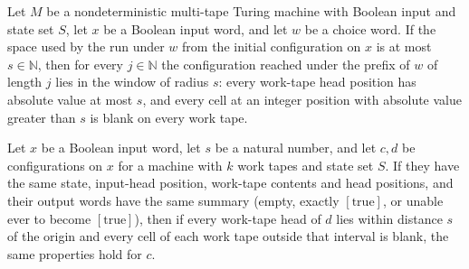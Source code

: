 \begin{theorem}
\label{Turing.NDTM.runWith_take_inWindow}
\leanok
{}
Let $M$ be a nondeterministic multi-tape Turing machine with Boolean input and state set
$S$, let $x$ be a Boolean input word, and let $w$ be a choice word. If the space used by
the run under $w$ from the initial configuration on $x$ is at most $s\in\mathbb{N}$,
then for every $j\in\mathbb{N}$ the configuration reached under the prefix of $w$ of
length $j$ lies in the window of radius $s$: every work-tape head position has absolute
value at most $s$, and every cell at an integer position with absolute value greater
than $s$ is blank on every work tape.
\end{theorem}

\begin{theorem}
\label{Turing.NDTM.inWindow_of_coreSum_eq}
\leanok
{}
Let $x$ be a Boolean input word, let $s$ be a natural number, and let $c,d$ be
configurations on $x$ for a machine with $k$ work tapes and state set $S$. If they have
the same state, input-head position, work-tape contents and head positions, and their
output words have the same summary (empty, exactly $[\mathrm{true}]$, or unable ever to
become $[\mathrm{true}]$), then if every work-tape head of $d$ lies within distance $s$
of the origin and every cell of each work tape outside that interval is blank, the same
properties hold for $c$.
\end{theorem}

